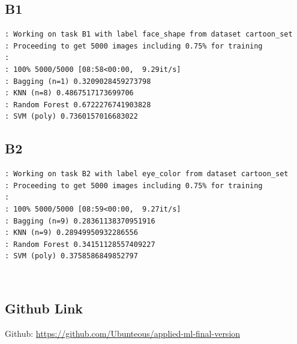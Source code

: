 \documentclass[a4paper,12pt,twoside,twocolumn]{article}
\begin{document}
\subsection{B1}
\label{sec:orgcca7483}

\begin{verbatim}
: Working on task B1 with label face_shape from dataset cartoon_set
: Proceeding to get 5000 images including 0.75% for training
: 
: 100% 5000/5000 [08:58<00:00,  9.29it/s]
: Bagging (n=1) 0.3209028459273798
: KNN (n=8) 0.4867517173699706
: Random Forest 0.6722276741903828
: SVM (poly) 0.7360157016683022
\end{verbatim}

\subsection{B2}
\label{sec:org14069be}

\begin{verbatim}
: Working on task B2 with label eye_color from dataset cartoon_set
: Proceeding to get 5000 images including 0.75% for training
: 
: 100% 5000/5000 [08:59<00:00,  9.27it/s]
: Bagging (n=9) 0.28361138370951916
: KNN (n=9) 0.28949950932286556
: Random Forest 0.34151128557409227
: SVM (poly) 0.3758586849852797
\end{verbatim}

\pagebreak \vfill\null \pagebreak\\

\subsection{Github Link}
\label{sec:orgd46ca3e}

Github: \url{https://github.com/Ubunteous/applied-ml-final-version}\\
\end{document}
